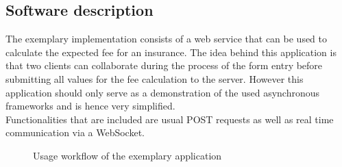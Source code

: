 \subsection{Software description}
\label{software_description}
\FloatBarrier
The exemplary implementation consists of a web service that can be used to calculate
the expected fee for an insurance. The idea behind this application is that
two clients can collaborate during the process of the form entry before submitting
all values for the fee calculation to the server.
However this application should only serve as a demonstration of the used asynchronous 
frameworks and is hence very simplified.\\
Functionalities that are included are usual POST requests as well as real time communication
via a WebSocket.

\begin{figure}[h]
	\centering
	\setlength\fboxsep{2pt}
	\caption{Usage workflow of the exemplary application}
	\label{fig:application_workflow}
\end{figure}


